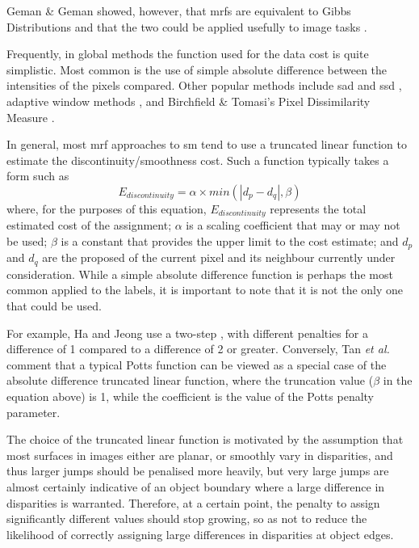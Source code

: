 Geman \& Geman \cite{Geman1984} showed, however, that \glspl{mrf} are equivalent to Gibbs Distributions and that the two could be applied usefully to image tasks \cite{Gimelfarb1999}.

Frequently, in global methods the function used for the data cost is quite simplistic.  Most common is the use of simple absolute difference between the intensities of the pixels compared.  Other popular methods include \gls{sad} and \gls{ssd} \fxnote[inline]{[ref]}, adaptive window methods \cite{Yoon2005,Yoon2006}, and Birchfield \& Tomasi's Pixel Dissimilarity Measure \cite{Birchfield1998}.

In general, most \gls{mrf} approaches to \gls{sm} tend to use a truncated linear function to estimate the discontinuity/smoothness cost.  Such a function typically takes a form such as \[ E_{discontinuity} = \alpha \times min(| d_p - d_q |, \beta) \] where, for the purposes of this equation, \(E_{discontinuity}\) represents the total estimated cost of the assignment; \(\alpha\) is a scaling coefficient that may or may not be used; \(\beta\) is a constant that provides the upper limit to the cost estimate; and \(d_p\) and \(d_q\) are the proposed  of the current pixel and its neighbour currently under consideration.  While a simple absolute difference function is perhaps the most common applied to the labels, it is important to note that it is not the only one that could be used.  

For example, Ha and Jeong \cite{Ha2016} use a two-step , with different penalties for a difference of 1 compared to a difference of 2 or greater. Conversely, Tan \textit{et al.} \cite{Tan2017} comment that a typical Potts function can be viewed as a special case of the absolute difference truncated linear function, where the truncation value (\(\beta\) in the equation above) is 1, while the coefficient is the value of the Potts penalty parameter.

The choice of the truncated linear function is motivated by the assumption that most surfaces in images either are planar, or smoothly vary in disparities, and thus larger jumps should be penalised more heavily, but very large jumps are almost certainly indicative of an object boundary where a large difference in disparities is warranted.  Therefore, at a certain point, the penalty to assign significantly different values should stop growing, so as not to reduce the likelihood of correctly assigning large differences in disparities at object edges.

